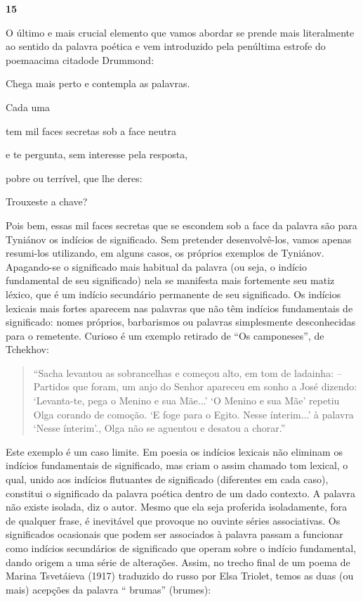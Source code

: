 \textbf{15}

O último e mais crucial elemento que vamos abordar se prende mais
literalmente ao sentido da palavra poética e vem introduzido pela
penúltima estrofe do poemaacima citadode Drummond:

Chega mais perto e contempla as palavras.

Cada uma

tem mil faces secretas sob a face neutra

e te pergunta, sem interesse pela resposta,

pobre ou terrível, que lhe deres:

Trouxeste a chave?

Pois bem, essas mil faces secretas que se escondem sob a face da palavra
são para Tyniánov os indícios de significado. Sem pretender
desenvolvê-los, vamos apenas resumi-los utilizando, em alguns casos, os
próprios exemplos de Tyniánov. Apagando-se o significado mais habitual
da palavra (ou seja, o indício fundamental de seu significado) nela se
manifesta mais fortemente seu matiz léxico, que é um indício secundário
permanente de seu significado. Os indícios lexicais mais fortes aparecem
nas palavras que não têm indícios fundamentais de significado: nomes
próprios, barbarismos ou palavras simplesmente desconhecidas para o
remetente. Curioso é um exemplo retirado de ``Os camponeses'', de
Tchekhov:

\begin{quote}
``Sacha levantou as sobrancelhas e começou alto, em tom de ladainha: --
Partidos que foram, um anjo do Senhor apareceu em sonho a José dizendo:
`Levanta-te, pega o Menino e sua Mãe...' `O Menino e sua Mãe' repetiu
Olga corando de comoção. `E foge para o Egito. Nesse ínterim...' à
palavra `Nesse ínterim'., Olga não se aguentou e desatou a chorar.''
\end{quote}

Este exemplo é um caso limite. Em poesia os indícios lexicais não
eliminam os indícios fundamentais de significado, mas criam o assim
chamado tom lexical, o qual, unido aos indícios flutuantes de
significado (diferentes em cada caso), constitui o significado da
palavra poética dentro de um dado contexto. A palavra não existe
isolada, diz o autor. Mesmo que ela seja proferida isoladamente, fora de
qualquer frase, é inevitável que provoque no ouvinte séries
associativas. Os significados ocasionais que podem ser associados à
palavra passam a funcionar como indícios secundários de significado que
operam sobre o indício fundamental, dando origem a uma série de
alterações. Assim, no trecho final de um poema de Marina Tsvetáieva
(1917) traduzido do russo por Elsa Triolet, temos as duas (ou mais)
acepções da palavra `` brumas'' (brumes):

